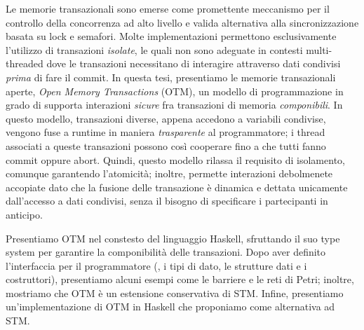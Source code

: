 
Le memorie transazionali sono emerse come promettente meccanismo per il controllo della concorrenza ad alto livello e valida alternativa alla sincronizzazione basata su lock e semafori.
Molte implementazioni permettono esclusivamente l'utilizzo di transazioni \emph{isolate}, le quali non sono adeguate in contesti multi-threaded dove le transazioni necessitano di interagire attraverso dati condivisi \emph{prima} di fare il commit.
In questa tesi, presentiamo le memorie transazionali aperte, \emph{Open Memory Transactions} (OTM), un modello di programmazione in grado di supporta interazioni \emph{sicure} fra transazioni di memoria \emph{componibili}. 
In questo modello, transazioni diverse, appena accedono a variabili condivise, vengono fuse a runtime in maniera \emph{trasparente} al programmatore; i thread associati a queste transazioni possono così cooperare fino a che tutti fanno commit oppure abort.
Quindi, questo modello rilassa il requisito di isolamento, comunque garantendo l'atomicità; inoltre, permette interazioni debolmenete accopiate dato che la fusione delle transazione è dinamica e dettata unicamente dall'accesso a dati condivisi, senza il bisogno di specificare i partecipanti in anticipo.

Presentiamo OTM nel constesto del linguaggio Haskell, sfruttando il suo type system per garantire la componibilità delle transazioni.
Dopo aver definito l'interfaccia per il programmatore (\ie, i tipi di dato, le strutture dati e i costruttori), presentiamo alcuni esempi come le barriere e le reti di Petri; inoltre, mostriamo che OTM è un estensione conservativa di STM.
Infine, presentiamo un'implementazione di OTM in Haskell che proponiamo come alternativa ad STM.
